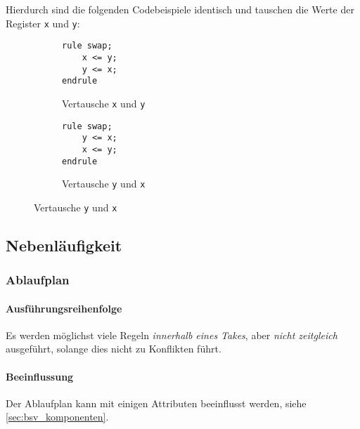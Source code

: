 \documentclass[a4paper, 11pt, accentcolor = tud3b]{tudreport}
\begin{document}
				Hierdurch sind die folgenden Codebeispiele identisch und tauschen die Werte der Register \texttt{x} und \texttt{y}:
				\begin{figure}[ht]
					\centering
					\begin{subfigure}{0.4\textwidth}
						\begin{lstlisting}
rule swap;
	x <= y;
	y <= x;
endrule
						\end{lstlisting}
						\caption{Vertausche \texttt{x} und \texttt{y}}
					\end{subfigure}
					\begin{subfigure}{0.4\textwidth}
						\begin{lstlisting}
rule swap;
	y <= x;
	x <= y;
endrule
						\end{lstlisting}
						\caption{Vertausche \texttt{y} und \texttt{x}}
					\end{subfigure}
				\end{figure}
			
			\subsection{Nebenläufigkeit}
				\subsubsection{Ablaufplan}
					\paragraph{Ausführungsreihenfolge}
						Es werden möglichst viele Regeln \textit{innerhalb eines Takes}, aber \textit{nicht zeitgleich} ausgeführt, solange dies nicht zu Konflikten führt.
					
					\paragraph{Beeinflussung}
						Der Ablaufplan kann mit einigen Attributen beeinflusst werden, siehe \ref{sec:bsv_komponenten}.
				
\end{document}
